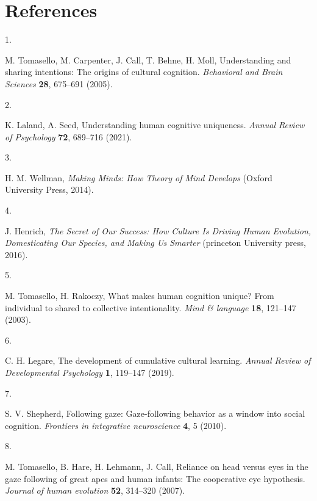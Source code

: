 \documentclass[
  man,floatsintext]{apa6}
\newlength{\cslhangindent}
\newlength{\csllabelwidth}
\newlength{\cslentryspacingunit} %
\newenvironment{CSLReferences}[2] %
 {%
  \setlength{\parindent}{0pt}
  \ifodd #1
  \let\oldpar\par
  \def\par{\hangindent=\cslhangindent\oldpar}
  \fi
  \setlength{\parskip}{#2\cslentryspacingunit}
 }%
 {}
\newcommand{\CSLLeftMargin}[1]{\parbox[t]{\csllabelwidth}{#1}}
\newcommand{\CSLRightInline}[1]{\parbox[t]{\linewidth - \csllabelwidth}{#1}\break}
\begin{document}
\newpage

\hypertarget{references}{%
\section{References}\label{references}}

\hypertarget{refs}{}
\begin{CSLReferences}{0}{0}
\leavevmode{}%
\CSLLeftMargin{1. }%
\CSLRightInline{M. Tomasello, M. Carpenter, J. Call, T. Behne, H. Moll, Understanding and sharing intentions: The origins of cultural cognition. \emph{Behavioral and Brain Sciences} \textbf{28}, 675--691 (2005).}

\leavevmode{}%
\CSLLeftMargin{2. }%
\CSLRightInline{K. Laland, A. Seed, Understanding human cognitive uniqueness. \emph{Annual Review of Psychology} \textbf{72}, 689--716 (2021).}

\leavevmode{}%
\CSLLeftMargin{3. }%
\CSLRightInline{H. M. Wellman, \emph{Making Minds: How Theory of Mind Develops} (Oxford University Press, 2014).}

\leavevmode{}%
\CSLLeftMargin{4. }%
\CSLRightInline{J. Henrich, \emph{The Secret of Our Success: How Culture Is Driving Human Evolution, Domesticating Our Species, and Making Us Smarter} (princeton University press, 2016).}

\leavevmode{}%
\CSLLeftMargin{5. }%
\CSLRightInline{M. Tomasello, H. Rakoczy, What makes human cognition unique? From individual to shared to collective intentionality. \emph{Mind \& language} \textbf{18}, 121--147 (2003).}

\leavevmode{}%
\CSLLeftMargin{6. }%
\CSLRightInline{C. H. Legare, The development of cumulative cultural learning. \emph{Annual Review of Developmental Psychology} \textbf{1}, 119--147 (2019).}

\leavevmode{}%
\CSLLeftMargin{7. }%
\CSLRightInline{S. V. Shepherd, Following gaze: Gaze-following behavior as a window into social cognition. \emph{Frontiers in integrative neuroscience} \textbf{4}, 5 (2010).}

\leavevmode{}%
\CSLLeftMargin{8. }%
\CSLRightInline{M. Tomasello, B. Hare, H. Lehmann, J. Call, Reliance on head versus eyes in the gaze following of great apes and human infants: The cooperative eye hypothesis. \emph{Journal of human evolution} \textbf{52}, 314--320 (2007).}


\end{CSLReferences}
\end{document}
